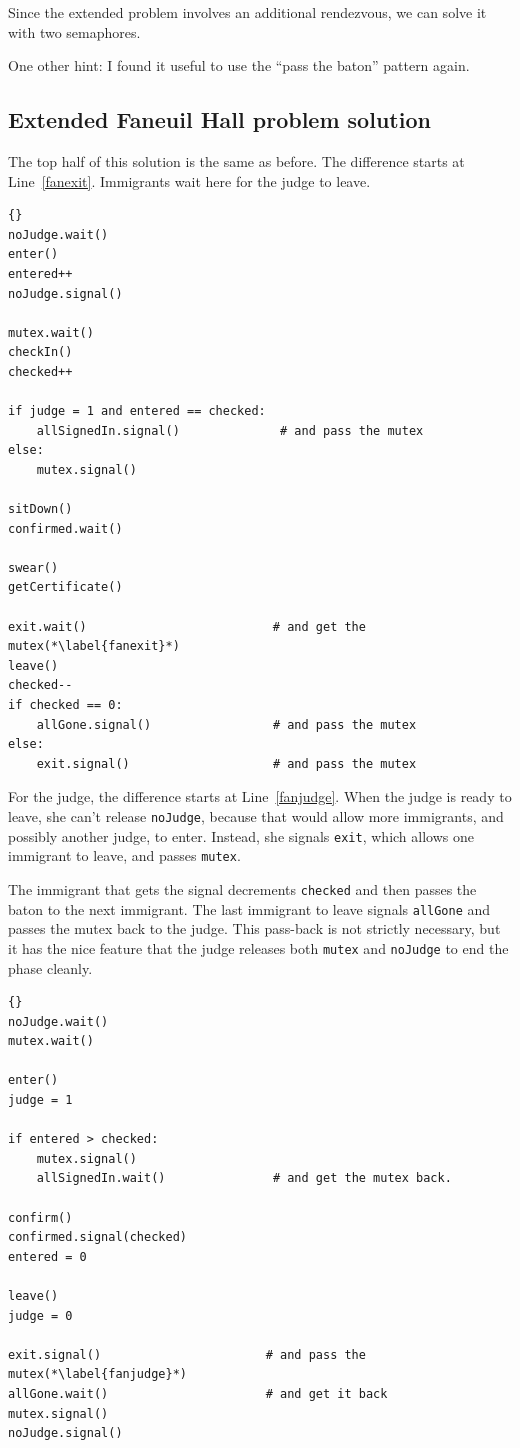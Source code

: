 \documentclass{book}
\newcommand{\clearemptydoublepage}{\newpage\cleardoublepage}
\begin{document}
Since the extended problem involves an additional rendezvous,
we can solve it with two semaphores.

One other hint: I found it useful to use the ``pass the baton''
pattern again.


\clearemptydoublepage
\subsection {Extended Faneuil Hall problem solution}

The top half of this solution is the same as before.  The
difference starts at Line~\ref{fanexit}.  Immigrants wait
here for the judge to leave.

\begin{lstlisting}[title={Faneuil Hall problem solution (immigrant)}]{}
noJudge.wait()
enter()
entered++
noJudge.signal()

mutex.wait()
checkIn()
checked++

if judge = 1 and entered == checked:
    allSignedIn.signal()              # and pass the mutex
else:
    mutex.signal()

sitDown()
confirmed.wait()

swear()
getCertificate()

exit.wait()                          # and get the mutex(*\label{fanexit}*)
leave()
checked--
if checked == 0:
    allGone.signal()                 # and pass the mutex
else:
    exit.signal()                    # and pass the mutex
\end{lstlisting}

For the judge, the difference starts at Line~\ref{fanjudge}.
When the judge is ready to leave, she can't release {\tt noJudge},
because that would allow more immigrants, and possibly another
judge, to enter.  Instead, she signals {\tt exit}, which allows
one immigrant to leave, and passes {\tt mutex}.

The immigrant that gets the signal decrements {\tt checked} and
then passes the baton to the next immigrant.  The last immigrant
to leave signals {\tt allGone} and passes the mutex back to the
judge.  This pass-back is not strictly necessary, but it has
the nice feature that the judge releases both {\tt mutex}
and {\tt noJudge} to end the phase cleanly.

\newpage
\begin{lstlisting}[title={Faneuil Hall problem solution (judge)}]{}
noJudge.wait()
mutex.wait()

enter()
judge = 1

if entered > checked:
    mutex.signal()
    allSignedIn.wait()               # and get the mutex back.

confirm()
confirmed.signal(checked)
entered = 0

leave()
judge = 0

exit.signal()                       # and pass the mutex(*\label{fanjudge}*)
allGone.wait()                      # and get it back
mutex.signal()
noJudge.signal()
\end{lstlisting}
\end{document}
